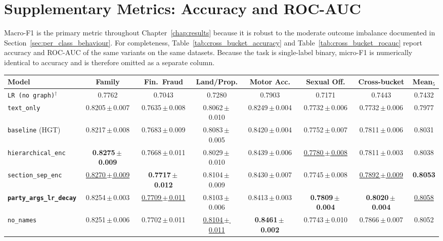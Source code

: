 \chapter{Supplementary Metrics: Accuracy and ROC-AUC}
\label{app:supplementary_metrics}

Macro-F1 is the primary metric throughout Chapter~\ref{chap:results}
because it is robust to the moderate outcome imbalance documented in
Section~\ref{sec:per_class_behaviour}. For completeness,
Table~\ref{tab:cross_bucket_accuracy} and
Table~\ref{tab:cross_bucket_rocauc} report accuracy and ROC-AUC of
the same variants on the same datasets. Because the task is
single-label binary, micro-F1 is numerically identical to accuracy
and is therefore omitted as a separate column.

\begin{table}[H]
  \centering
  \scriptsize
  \setlength{\tabcolsep}{3pt}
  \begin{adjustbox}{max width=\textwidth}
  \begin{tabular}{lccccccc}
    \toprule
    Model & Family & Fin.\ Fraud & Land/Prop. & Motor Acc. & Sexual Off. & Cross-bucket & Mean$_5$ \\
    \midrule
    \texttt{LR (no graph)}$^{\dagger}$ & 0.7762 & 0.7043 & 0.7280 & 0.7903 & 0.7171 & 0.7443 & 0.7432 \\
    \texttt{text\_only} & 0.8205\,$\pm$\,0.007 & 0.7635\,$\pm$\,0.008 & 0.8062\,$\pm$\,0.010 & 0.8249\,$\pm$\,0.004 & 0.7732\,$\pm$\,0.006 & 0.7732\,$\pm$\,0.006 & 0.7977 \\
    \texttt{baseline} (HGT) & 0.8217\,$\pm$\,0.008 & 0.7683\,$\pm$\,0.009 & 0.8083\,$\pm$\,0.005 & 0.8420\,$\pm$\,0.004 & 0.7752\,$\pm$\,0.007 & 0.7811\,$\pm$\,0.006 & 0.8031 \\
    \texttt{hierarchical\_enc} & \textbf{0.8275\,$\pm$\,0.009} & 0.7668\,$\pm$\,0.011 & 0.8029\,$\pm$\,0.010 & 0.8439\,$\pm$\,0.006 & \underline{0.7780\,$\pm$\,0.008} & 0.7811\,$\pm$\,0.003 & 0.8038 \\
    \texttt{section\_sep\_enc} & \underline{0.8270\,$\pm$\,0.009} & \textbf{0.7717\,$\pm$\,0.012} & 0.8104\,$\pm$\,0.009 & 0.8430\,$\pm$\,0.007 & 0.7745\,$\pm$\,0.008 & \underline{0.7892\,$\pm$\,0.009} & \textbf{0.8053} \\
    \textbf{\texttt{party\_args\_lr\_decay}} & 0.8254\,$\pm$\,0.003 & \underline{0.7709\,$\pm$\,0.011} & 0.8103\,$\pm$\,0.006 & 0.8413\,$\pm$\,0.003 & \textbf{0.7809\,$\pm$\,0.004} & \textbf{0.8020\,$\pm$\,0.004} & \underline{0.8058} \\
    \texttt{no\_names} & 0.8251\,$\pm$\,0.006 & 0.7702\,$\pm$\,0.011 & \underline{0.8104\,$\pm$\,0.011} & \textbf{0.8461\,$\pm$\,0.002} & 0.7743\,$\pm$\,0.010 & 0.7866\,$\pm$\,0.007 & 0.8052 \\

\end{tabular}
\end{adjustbox}
\end{table}
